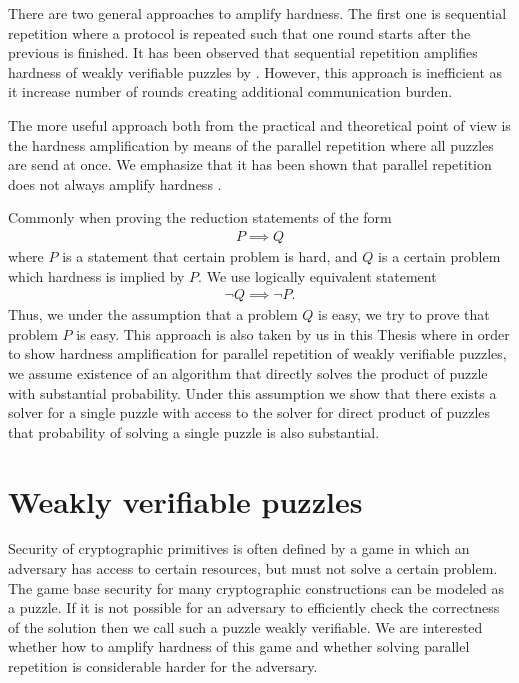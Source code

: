 \documentclass[11pt,a4paper,titlepage]{memoir}
\begin{document}
There are two general approaches to amplify hardness.
The first one is sequential repetition where a protocol is repeated such that one round starts after the previous is finished.
It has been observed that sequential repetition amplifies hardness of weakly verifiable puzzles by \cite{von2003captcha}.
However, this approach is inefficient as it increase number of rounds creating additional communication burden.

The more useful approach both from the practical and theoretical point of view is the hardness amplification by means of the
parallel repetition where all puzzles are send at once.
We emphasize that it has been shown that parallel repetition does not always amplify hardness \cite{bellare1997does}.

Commonly when proving the reduction statements of the form
\begin{align*}
  P \implies Q
\end{align*}
where $P$ is a statement that certain problem is hard, and $Q$ is a certain problem which hardness is implied by $P$.
We use logically equivalent statement
\begin{align*}
  \lnot Q \implies \lnot P.
\end{align*}
Thus, we under the assumption that a problem $Q$ is easy, we try to prove that problem $P$ is easy.
This approach is also taken by us in this Thesis where in order to show hardness amplification for parallel repetition of weakly verifiable puzzles,
we assume existence of an algorithm that directly solves the product of puzzle with substantial probability.
Under this assumption we show that there exists a solver for a single puzzle with access to the solver for direct product of puzzles that
probability of solving a single puzzle is also substantial.

\section{Weakly verifiable puzzles}
Security of cryptographic primitives is often defined by
a game in which an adversary has access to certain resources, but must not solve a certain problem.
The game base security for many cryptographic constructions can be modeled as a puzzle.
If it is not possible for an adversary to efficiently check the correctness of the solution then
we call such a puzzle weakly verifiable. We are interested whether how to amplify hardness of this game
and whether solving parallel repetition is considerable harder for the adversary.
\end{document}
